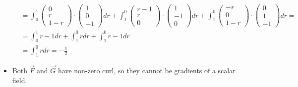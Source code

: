 \documentclass[11pt]{article}
\begin{document}
\begin{solution}
\begin{itemize}
\begin{align*}
	&= \int_0^1 \begin{pmatrix}0\\r\\1-r\end{pmatrix}\cdot\begin{pmatrix}1\\0\\-1\end{pmatrix}dr + \int_1^0 \begin{pmatrix}r-1\\r\\0\end{pmatrix}\cdot\begin{pmatrix}1\\-1\\0\end{pmatrix}dr + \int_1^0 \begin{pmatrix}-r\\0\\1-r\end{pmatrix}\cdot\begin{pmatrix}0\\1\\-1\end{pmatrix}dr =\\
	&= \int_0^1 r-1dr + \int_1^0 rdr + \int_1^0 r-1dr\\
	&= \int_1^0 rdr = -\frac{1}{2}
	\end{align*}
     \item 
     Both $\vec F$ and $\vec G$ have non-zero curl, so they cannot be gradients of a scalar field. 
    \end{itemize}
\end{solution}
\end{document}
